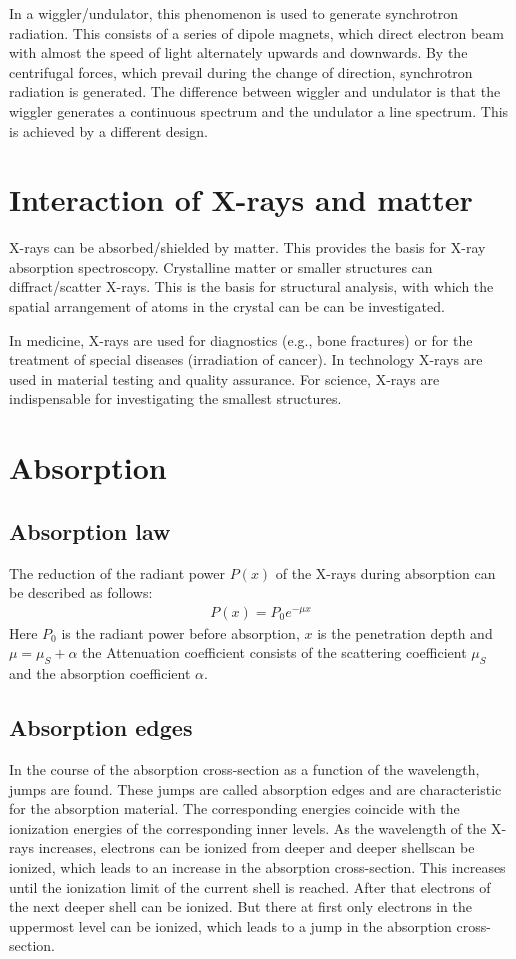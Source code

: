 In a wiggler/undulator, this phenomenon is used to generate synchrotron radiation.
This consists of a series of dipole magnets, which direct
electron beam with almost the speed of light alternately upwards and downwards. By the centrifugal forces, which prevail during the change of direction, synchrotron radiation is generated.
The difference between wiggler and undulator is that the
wiggler generates a continuous spectrum and the undulator a line spectrum. This
is achieved by a different design.

\section{Interaction of X-rays and matter}
X-rays can be absorbed/shielded by matter. This provides the basis
for X-ray absorption spectroscopy.
Crystalline matter or smaller structures can diffract/scatter X-rays. This
is the basis for structural analysis, with which the spatial arrangement of atoms in the crystal can be
can be investigated.

In medicine, X-rays are used for diagnostics (e.g., bone fractures) or for the
treatment of special diseases (irradiation of cancer). In technology
X-rays are used in material testing and quality assurance.
For science, X-rays are indispensable for investigating the smallest structures.

\section{Absorption}

\subsection{Absorption law}
The reduction of the radiant power $P(x)$ of the X-rays during absorption can be described as follows:
\begin{align}
    P(x) = P_0 e^{-\mu x}
\end{align}
Here $P_0$ is the radiant power before absorption, $x$ is the penetration depth and $\mu = \mu_S + \alpha$ the
Attenuation coefficient consists of the scattering coefficient $\mu_S$ and the absorption coefficient
$\alpha$.

\subsection{Absorption edges}
In the course of the absorption cross-section as a function of the wavelength, jumps are found.
These jumps are called absorption edges and are characteristic for the
absorption material. The corresponding energies coincide with the ionization energies of the
corresponding inner levels.
As the wavelength of the X-rays increases, electrons can be ionized from deeper and deeper shellscan be ionized, which leads to an increase in the absorption cross-section. This increases
until the ionization limit of the current shell is reached. After that electrons of the next deeper shell can be ionized. But there at first only electrons
in the uppermost level can be ionized, which leads to a jump in the absorption cross-section.

